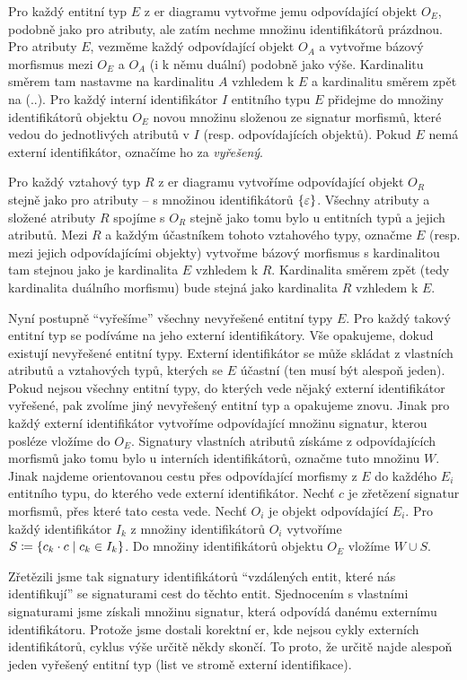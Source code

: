 Pro každý entitní typ $E$ z \acrshort{er} diagramu vytvořme jemu odpovídající objekt $O_E$, podobně jako pro atributy, ale zatím nechme množinu identifikátorů prázdnou.
Pro atributy $E$, vezměme každý odpovídající objekt $O_A$ a vytvořme bázový morfismus mezi $O_E$ a $O_A$ (i k němu duální) podobně jako výše.
Kardinalitu směrem tam nastavme na kardinalitu $A$ vzhledem k $E$ a kardinalitu směrem zpět na (\one{}..\one{}).
Pro každý interní identifikátor $I$ entitního typu $E$ přidejme do množiny identifikátorů objektu $O_E$ novou množinu složenou ze signatur morfismů, které vedou do jednotlivých atributů v $I$ (resp. odpovídajících objektů).
Pokud $E$ nemá externí identifikátor, označíme ho za \emph{vyřešený}.

Pro každý vztahový typ $R$ z \acrshort{er} diagramu vytvoříme odpovídající objekt $O_R$ stejně jako pro atributy -- s množinou identifikátorů $\left\{\varepsilon\right\}$.
Všechny atributy a složené atributy $R$ spojíme s $O_R$ stejně jako tomu bylo u entitních typů a jejich atributů.
Mezi $R$ a každým účastníkem tohoto vztahového typy, označme $E$ (resp. mezi jejich odpovídajícími objekty) vytvořme bázový morfismus s kardinalitou tam stejnou jako je kardinalita $E$ vzhledem k $R$.
Kardinalita směrem zpět (tedy kardinalita duálního morfismu) bude stejná jako kardinalita $R$ vzhledem  k $E$.

Nyní postupně \enquote{vyřešíme} všechny nevyřešené entitní typy $E$.
Pro každý takový entitní typ se podíváme na jeho externí identifikátory.
Vše opakujeme, dokud existují nevyřešené entitní typy.
Externí identifikátor se může skládat z vlastních atributů a vztahových typů, kterých se $E$ účastní (ten musí být alespoň jeden).
Pokud nejsou všechny entitní typy, do kterých vede nějaký externí identifikátor vyřešené, pak zvolíme jiný nevyřešený entitní typ a opakujeme znovu.
Jinak pro každý externí identifikátor vytvoříme odpovídající množinu signatur, kterou posléze vložíme do $O_E$.
Signatury vlastních atributů získáme z odpovídajících morfismů jako tomu bylo u interních identifikátorů, označme tuto množinu $W$.
Jinak najdeme orientovanou cestu přes odpovídající morfismy z $E$ do každého $E_i$ entitního typu, do kterého vede externí identifikátor.
Nechť $c$ je zřetězení signatur morfismů, přes které tato cesta vede.
Nechť $O_i$ je objekt odpovídající $E_i$.
Pro každý identifikátor $I_k$ z množiny identifikátorů $O_i$ vytvoříme $S\coloneqq \left\{c_k\cdot c\mid c_k\in I_k\right\}$.
Do množiny identifikátorů objektu $O_E$ vložíme $W\cup S$.

Zřetězili jsme tak signatury identifikátorů \enquote{vzdálených entit, které nás identifikují} se signaturami cest do těchto entit.
Sjednocením s vlastními signaturami jsme získali množinu signatur, která odpovídá danému externímu identifikátoru.
Protože jsme dostali korektní \acrshort{er}, kde nejsou cykly externích identifikátorů, cyklus výše určitě někdy skončí.
To proto, že určitě najde alespoň jeden vyřešený entitní typ (list ve stromě externí identifikace).


